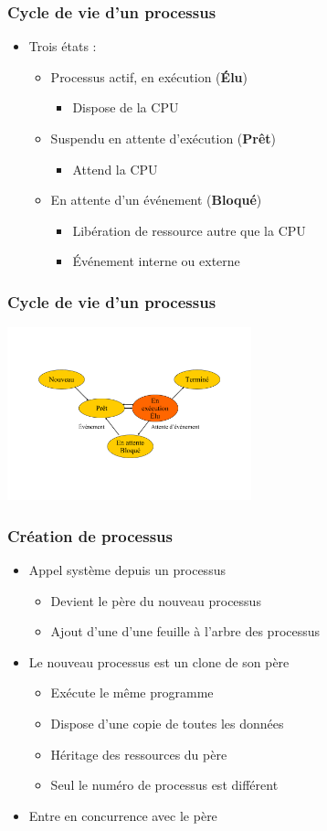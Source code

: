 \begin{frame}
\frametitle{Cycle de vie d'un processus}
\begin{itemize}
\item Trois états :
\begin{itemize}
\item Processus actif, en exécution (\textbf{Élu})
\begin{itemize}
\item Dispose de la CPU
\end{itemize}
\item Suspendu en attente d’exécution (\textbf{Prêt})
\begin{itemize}
\item Attend la CPU
\end{itemize}
\item En attente d’un événement (\textbf{Bloqué})
\begin{itemize}
\item Libération de ressource autre que la CPU
\item Événement interne ou externe
\end{itemize}
\end{itemize}
\end{itemize}
\end{frame}

\begin{frame}
\frametitle{Cycle de vie d'un processus}
\includegraphics[height=5cm]{../illustration/process_cycle_vie.pdf}
\end{frame}


\begin{frame}
\frametitle{Création de processus}
\begin{itemize}
\item Appel système depuis un processus
\begin{itemize}
\item Devient le père du nouveau processus
\item Ajout d'une d’une feuille à l’arbre des processus
\end{itemize}
\item Le nouveau processus est un clone de son père
\begin{itemize}
\item Exécute le même programme
\item Dispose d'une copie de toutes les données
\item Héritage des ressources du père
\item Seul le numéro de processus est différent
\end{itemize}
\item Entre en concurrence avec le père
\end{itemize}
\end{frame}


